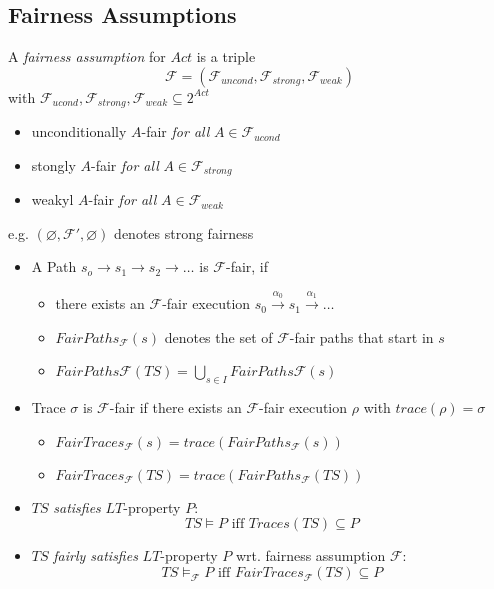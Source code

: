 \documentclass[a4paper, 10pt]{article}
\begin{document}
\subsection*{Fairness Assumptions}
\begin{shaded}
    A \emph{fairness assumption} for $Act$ is a triple \[ \mathcal{F}=(\mathcal{F}_{uncond},\mathcal{F}_{strong},\mathcal{F}_{weak}) \] with $\mathcal{F}_{ucond},\mathcal{F}_{strong},\mathcal{F}_{weak}\subseteq 2^{Act}$
    \begin{itemize}
        \item unconditionally $A$-fair \emph{for all} $A\in\mathcal{F}_{ucond}$
        \item stongly $A$-fair \emph{for all} $A\in\mathcal{F}_{strong}$
        \item weakyl $A$-fair \emph{for all} $A\in\mathcal{F}_{weak}$
    \end{itemize}
    e.g. $(\varnothing,\mathcal{F}',\varnothing)$ denotes strong fairness
\end{shaded}
\begin{itemize}
    \item A Path $s_o\to s_1\to s_2\to\dots$ is $\mathcal{F}$-fair, if
    \begin{itemize}
        \item there exists an $\mathcal{F}$-fair execution $s_0\overset{\alpha_0}{\longrightarrow}s_1\overset{\alpha_1}{\longrightarrow}\dots$
        \item $FairPaths_\mathcal{F}(s)$ denotes the set of $\mathcal{F}$-fair paths that start in $s$
        \item $FairPaths\mathcal{F}(TS)=\bigcup_{s\in I} FairPaths\mathcal{F}(s)$
    \end{itemize}
    \item Trace $\sigma$ is $\mathcal{F}$-fair if there exists an $\mathcal{F}$-fair execution $\rho$ with $trace(\rho)=\sigma$
    \begin{itemize}
        \item $FairTraces_\mathcal{F}(s)=trace(FairPaths_\mathcal{F}(s))$
        \item $FairTraces_\mathcal{F}(TS)=trace(FairPaths_\mathcal{F}(TS))$
    \end{itemize}
    \item $TS$ \emph{satisfies} $LT$-property $P$: \[ TS\models P \textrm{ iff } Traces(TS)\subseteq P \]
    \item $TS$ \emph{fairly satisfies} $LT$-property $P$ wrt. fairness assumption $\mathcal{F}$: \[ TS\models_\mathcal{F} P \textrm{ iff } FairTraces_\mathcal{F}(TS)\subseteq P \]
\end{itemize}
\end{document}
